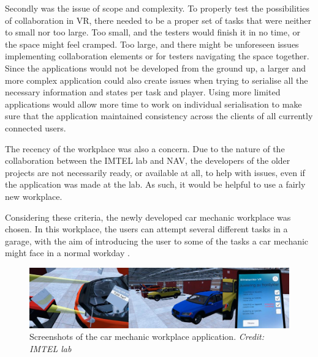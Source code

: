 Secondly was the issue of scope and complexity. To properly test the possibilities of collaboration in VR, there needed to be a proper set of tasks that were neither to small nor too large. Too small, and the testers would finish it in no time, or the space might feel cramped. Too large, and there might be unforeseen issues implementing collaboration elements or for testers navigating the space together. Since the applications would not be developed from the ground up, a larger and more complex application could also create issues when trying to serialise all the necessary information and states per task and player. Using more limited applications would allow more time to work on individual serialisation to make sure that the application maintained consistency across the clients of all currently connected users. 

The recency of the workplace was also a concern. Due to the nature of the collaboration between the IMTEL lab and NAV, the developers of the older projects are not necessarily ready, or available at all, to help with issues, even if the application was made at the lab. As such, it would be helpful to use a fairly new workplace.

Considering these criteria, the newly developed car mechanic workplace was chosen. In this workplace, the users can attempt several different tasks in a garage, with the aim of introducing the user to some of the tasks a car mechanic might face in a normal workday \cite{IMTELinternships}.


\begin{figure}[H]
  \centering
    \captionsetup{width=1\linewidth}
    \includegraphics[width=1\textwidth]{fig/phase_2/Car-mechanic-app-screen.jpg}
    \caption{Screenshots of the car mechanic workplace application. \textit{Credit: IMTEL lab}}
\label{fig:Car-mechanic-app}
\end{figure}


